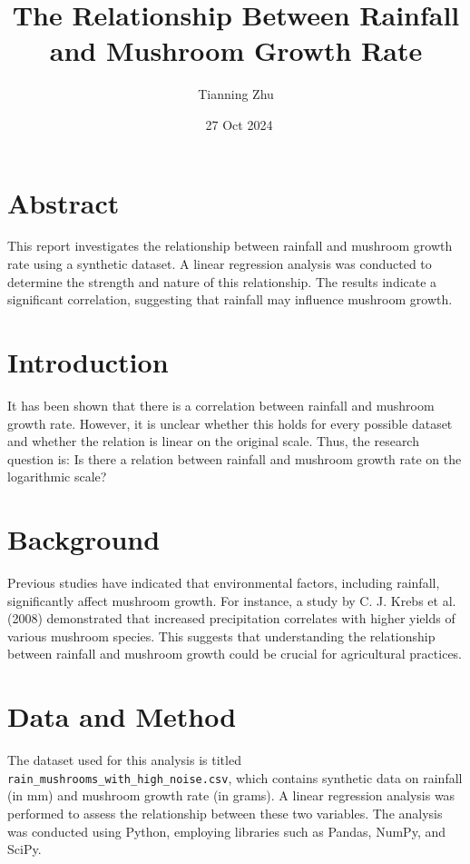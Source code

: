 \documentclass{article}
\title{The Relationship Between Rainfall and Mushroom Growth Rate}
\author{Tianning Zhu}
\date{\ 27 Oct 2024}
\begin{document}
\maketitle

\section*{Abstract}
This report investigates the relationship between rainfall and mushroom growth rate using a synthetic dataset. A linear regression analysis was conducted to determine the strength and nature of this relationship. The results indicate a significant correlation, suggesting that rainfall may influence mushroom growth.

\section*{Introduction}
It has been shown that there is a correlation between rainfall and mushroom growth rate. However, it is unclear whether this holds for every possible dataset and whether the relation is linear on the original scale. Thus, the research question is: Is there a relation between rainfall and mushroom growth rate on the logarithmic scale?

\section*{Background}
Previous studies have indicated that environmental factors, including rainfall, significantly affect mushroom growth. For instance, a study by C. J. Krebs et al. (2008) demonstrated that increased precipitation correlates with higher yields of various mushroom species. This suggests that understanding the relationship between rainfall and mushroom growth could be crucial for agricultural practices.

\section*{Data and Method}
The dataset used for this analysis is titled \texttt{rain\_mushrooms\_with\_high\_noise.csv}, which contains synthetic data on rainfall (in mm) and mushroom growth rate (in grams). A linear regression analysis was performed to assess the relationship between these two variables. The analysis was conducted using Python, employing libraries such as Pandas, NumPy, and SciPy.
\end{document}

